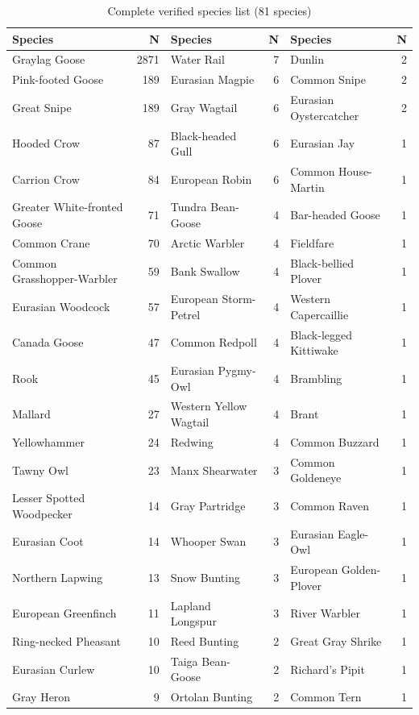 \documentclass[twocolumn]{article}
\begin{document}
\begin{table}[H]
\centering
\caption{Complete verified species list (81 species)}
\label{tab:species_full}
\tiny
\begin{tabular}{lr|lr|lr}
\toprule
\textbf{Species} & \textbf{N} & \textbf{Species} & \textbf{N} & \textbf{Species} & \textbf{N} \\
\midrule
Graylag Goose & 2871 & Water Rail & 7 & Dunlin & 2 \\
Pink-footed Goose & 189 & Eurasian Magpie & 6 & Common Snipe & 2 \\
Great Snipe & 189 & Gray Wagtail & 6 & Eurasian Oystercatcher & 2 \\
Hooded Crow & 87 & Black-headed Gull & 6 & Eurasian Jay & 1 \\
Carrion Crow & 84 & European Robin & 6 & Common House-Martin & 1 \\
Greater White-fronted Goose & 71 & Tundra Bean-Goose & 4 & Bar-headed Goose & 1 \\
Common Crane & 70 & Arctic Warbler & 4 & Fieldfare & 1 \\
Common Grasshopper-Warbler & 59 & Bank Swallow & 4 & Black-bellied Plover & 1 \\
Eurasian Woodcock & 57 & European Storm-Petrel & 4 & Western Capercaillie & 1 \\
Canada Goose & 47 & Common Redpoll & 4 & Black-legged Kittiwake & 1 \\
Rook & 45 & Eurasian Pygmy-Owl & 4 & Brambling & 1 \\
Mallard & 27 & Western Yellow Wagtail & 4 & Brant & 1 \\
Yellowhammer & 24 & Redwing & 4 & Common Buzzard & 1 \\
Tawny Owl & 23 & Manx Shearwater & 3 & Common Goldeneye & 1 \\
Lesser Spotted Woodpecker & 14 & Gray Partridge & 3 & Common Raven & 1 \\
Eurasian Coot & 14 & Whooper Swan & 3 & Eurasian Eagle-Owl & 1 \\
Northern Lapwing & 13 & Snow Bunting & 3 & European Golden-Plover & 1 \\
European Greenfinch & 11 & Lapland Longspur & 3 & River Warbler & 1 \\
Ring-necked Pheasant & 10 & Reed Bunting & 2 & Great Gray Shrike & 1 \\
Eurasian Curlew & 10 & Taiga Bean-Goose & 2 & Richard's Pipit & 1 \\
Gray Heron & 9 & Ortolan Bunting & 2 & Common Tern & 1 \\

\end{tabular}
\end{table}
\end{document}
